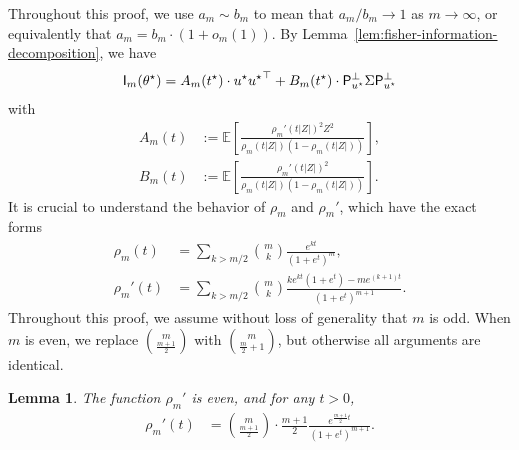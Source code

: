 \documentclass[11pt]{article}
\newcommand{\E}{\mathbb{E}}
\newcommand{\brk}[1]{\left[{#1}\right]} %
\newcommand{\proj}{\mathsf{P}}
\newcommand{\<}{\langle} %
\renewcommand{\>}{\rangle}
\newcommand{\opt}{^\star}
\newtheorem{lemma}[claim]{Lemma}
\begin{document}
Throughout this proof, we use $a_m \sim b_m$ to mean that
$a_m/b_m \to 1$ as $m \to \infty$, or equivalently that
$a_m = b_m \cdot(1 + o_m(1))$.
By Lemma~\ref{lem:fisher-information-decomposition},
we have 
\begin{align*} 
	\fisher_m(\theta\opt) = A_m (t\opt) \cdot u\opt {u\opt}^\top +   B_m (t\opt) \cdot \proj_{u\opt}^\perp \Sigma \proj_{u\opt}^\perp 
\end{align*}
with
\begin{subequations}
\begin{align}
	A_m(t) & := \E \brk{\frac{\rho_m'(t|Z|)^2 Z^2}{\rho_m(t|Z|) ( 1 - \rho_m(t|Z|))}}, \label{eq:fisher-information-Am} \\
	B_m(t)& := \E \brk{\frac{\rho_m'(t|Z|)^2 }{\rho_m(t|Z|) ( 1 - \rho_m(t|Z|))}}. \label{eq:fisher-information-Bm}
\end{align}
\end{subequations}
It is crucial to understand the behavior of
$\rho_m$ and $\rho_m'$, which have the exact forms
\begin{align*}
  \rho_m(t) & %
  = \sum_{k>m/2}\binom{m}{k} \frac{e^{kt}}{(1+e^t)^m}, \\
  \rho_m'(t) & %
  = \sum_{k > m/2} \binom{m}{k} \frac{ke^{kt} (1+e^t) - me^{(k+1)t}}{(1+e^t)^{m+1}}.
\end{align*}
Throughout this proof, we assume without loss of generality that $m$ is
odd. When $m$ is even, we replace $\binom{m}{\frac{m+1}{2}}$ with
$\binom{m}{\frac{m}{2}+1}$, but otherwise all arguments are identical.
\begin{lemma} \label{lem:rho-m-prime-asymptotics}
	The function $\rho_m'$ is even, and for any $t > 0$,
	\begin{align*}
		\rho_m'(t) &= \binom{m}{\frac{m+1}{2}} \cdot \frac{m+1}{2} \frac{e^{\frac{m+1}{2}t}}{(1+e^t)^{m+1}}.
	\end{align*}
\end{lemma}
\end{document}
